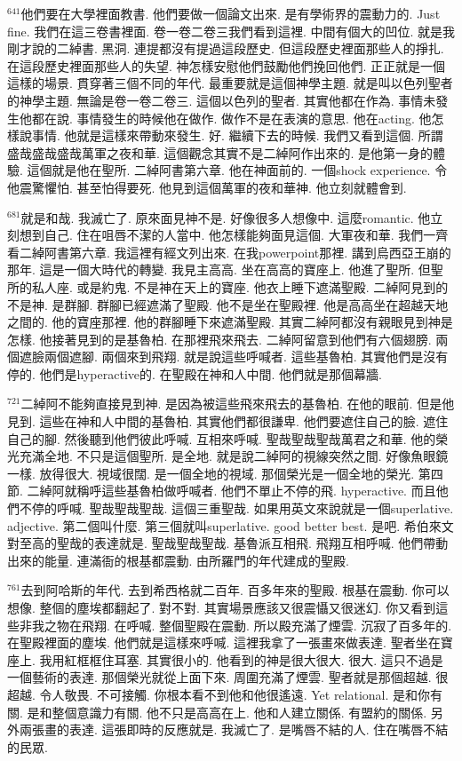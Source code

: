 \documentclass{book}
\begin{document}
$^{641}$他們要在大學裡面教書.
他們要做一個論文出來.
是有學術界的震動力的.
Just fine.
我們在這三卷書裡面.
卷一卷二卷三我們看到這裡.
中間有個大的凹位.
就是我剛才說的二綽書.
黑洞.
連提都沒有提過這段歷史.
但這段歷史裡面那些人的掙扎.
在這段歷史裡面那些人的失望.
神怎樣安慰他們鼓勵他們挽回他們.
正正就是一個這樣的場景.
貫穿著三個不同的年代.
最重要就是這個神學主題.
就是叫以色列聖者的神學主題.
無論是卷一卷二卷三.
這個以色列的聖者.
其實他都在作為.
事情未發生他都在說.
事情發生的時候他在做作.
做作不是在表演的意思.
他在acting.
他怎樣說事情.
他就是這樣來帶動來發生.
好.
繼續下去的時候.
我們又看到這個.
所謂盛哉盛哉盛哉萬軍之夜和華.
這個觀念其實不是二綽阿作出來的.
是他第一身的體驗.
這個就是他在聖所.
二綽阿書第六章.
他在神面前的.
一個shock experience.
令他震驚懼怕.
甚至怕得要死.
他見到這個萬軍的夜和華神.
他立刻就體會到.

$^{681}$就是和哉.
我滅亡了.
原來面見神不是.
好像很多人想像中.
這麼romantic.
他立刻想到自己.
住在咀唇不潔的人當中.
他怎樣能夠面見這個.
大軍夜和華.
我們一齊看二綽阿書第六章.
我這裡有經文列出來.
在我powerpoint那裡.
講到烏西亞王崩的那年.
這是一個大時代的轉變.
我見主高高.
坐在高高的寶座上.
他進了聖所.
但聖所的私人座.
或是約鬼.
不是神在天上的寶座.
他衣上睡下遮滿聖殿.
二綽阿見到的不是神.
是群腳.
群腳已經遮滿了聖殿.
他不是坐在聖殿裡.
他是高高坐在超越天地之間的.
他的寶座那裡.
他的群腳睡下來遮滿聖殿.
其實二綽阿都沒有親眼見到神是怎樣.
他接著見到的是基魯柏.
在那裡飛來飛去.
二綽阿留意到他們有六個翅膀.
兩個遮臉兩個遮腳.
兩個來到飛翔.
就是說這些呼喊者.
這些基魯柏.
其實他們是沒有停的.
他們是hyperactive的.
在聖殿在神和人中間.
他們就是那個幕牆.

$^{721}$二綽阿不能夠直接見到神.
是因為被這些飛來飛去的基魯柏.
在他的眼前.
但是他見到.
這些在神和人中間的基魯柏.
其實他們都很謙卑.
他們要遮住自己的臉.
遮住自己的腳.
然後聽到他們彼此呼喊.
互相來呼喊.
聖哉聖哉聖哉萬君之和華.
他的榮光充滿全地.
不只是這個聖所.
是全地.
就是說二綽阿的視線突然之間.
好像魚眼鏡一樣.
放得很大.
視域很闊.
是一個全地的視域.
那個榮光是一個全地的榮光.
第四節.
二綽阿就稱呼這些基魯柏做呼喊者.
他們不單止不停的飛.
hyperactive.
而且他們不停的呼喊.
聖哉聖哉聖哉.
這個三重聖哉.
如果用英文來說就是一個superlative.
adjective.
第二個叫什麼.
第三個就叫superlative.
good better best.
是吧.
希伯來文對至高的聖哉的表達就是.
聖哉聖哉聖哉.
基魯派互相飛.
飛翔互相呼喊.
他們帶動出來的能量.
連滿衙的根基都震動.
由所羅門的年代建成的聖殿.

$^{761}$去到阿哈斯的年代.
去到希西格就二百年.
百多年來的聖殿.
根基在震動.
你可以想像.
整個的塵埃都翻起了.
對不對.
其實場景應該又很震懾又很迷幻.
你又看到這些非我之物在飛翔.
在呼喊.
整個聖殿在震動.
所以殿充滿了煙雲.
沉寂了百多年的.
在聖殿裡面的塵埃.
他們就是這樣來呼喊.
這裡我拿了一張畫來做表達.
聖者坐在寶座上.
我用紅框框住耳塞.
其實很小的.
他看到的神是很大很大.
很大.
這只不過是一個藝術的表達.
那個榮光就從上面下來.
周圍充滿了煙雲.
聖者就是那個超越.
很超越.
令人敬畏.
不可接觸.
你根本看不到他和他很遙遠.
Yet relational.
是和你有關.
是和整個意識力有關.
他不只是高高在上.
他和人建立關係.
有盟約的關係.
另外兩張畫的表達.
這張即時的反應就是.
我滅亡了.
是嘴唇不結的人.
住在嘴唇不結的民眾.
\end{document}
